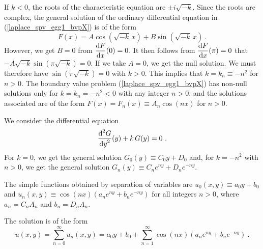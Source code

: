 \begin{egg}
If $k<0$, the roots of the characteristic equation are $\pm i \sqrt{-k}$.
Since the roots are complex, the general solution of the ordinary
differential equation in (\ref{laplace_spv_egg1_bvpX}) is of the form
\[
F(x) = A \cos\left(\sqrt{-k}\,x\right)
+ B \sin\left(\sqrt{-k}\,x\right) \ .
\]
However, we get $B =0$ from $\displaystyle \frac{\mathrm{d}F}{\mathrm{d}{x}}(0)=0$.  It then
follows from $\displaystyle \frac{\mathrm{d}F}{\mathrm{d}{x}}(\pi)=0$ that\\
$-A \sqrt{-k} \sin\left(\pi\sqrt{-k}\right) = 0$.  If we take $A=0$,
we get the null solution.  We must therefore have
$\sin\left(\pi\sqrt{-k}\right) = 0$ with $k>0$.  This implies
that $k = k_n \equiv -n^2$ for $n>0$.  The boundary value
problem (\ref{laplace_spv_egg1_bvpX}) has non-null 
solutions only for $k=k_n = -n^2<0$ with any integer $n>0$, and the
solutions associated are of the form
$\displaystyle F(x)=F_n(x) \equiv A_n \cos(nx)$ for $n > 0$.

We consider the differential equation
\[
\frac{\displaystyle \mathrm{d}^{2}{G}} {\displaystyle \mathrm{d}{y}^{2}}(y) + k\,G(y) = 0 \ .
\]
For $k=0$, we get the general solution
$G_0(y) \equiv C_0 y + D_0$ and, for $k= -n^2$ with $n>0$, we get the
general solution $\displaystyle G_n(y) \equiv C_n e^{ny} + D_n e^{-ny}$.

The simple functions obtained by separation of variables are
$\displaystyle u_0(x,y) \equiv a_0 y + b_0$ and
$\displaystyle u_n(x,y) \equiv \cos(n x)\left(a_n e^{n y} + b_n e^{-n y}\right)$
for all integers $n>0$, where $a_n = C_n A_n$ and $b_n = D_n A_n$.

The solution is of the form
\[
u(x,y) = \sum_{n=0}^\infty u_n(x,y) =  a_0 y + b_0
+ \sum_{n=1}^\infty \cos(n x)\left(a_n e^{n y} + b_n e^{-n y}\right) \ .
\]


\end{egg}
